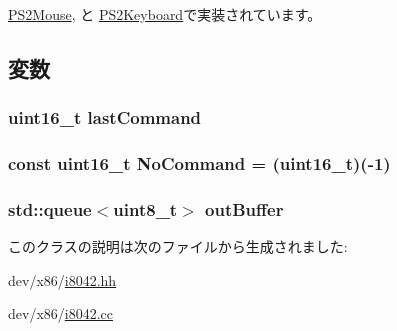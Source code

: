 \hyperlink{classX86ISA_1_1PS2Mouse_a501fdeaf8d614f432cfbf95f23675982}{PS2Mouse}, と \hyperlink{classX86ISA_1_1PS2Keyboard_a501fdeaf8d614f432cfbf95f23675982}{PS2Keyboard}で実装されています。

\subsection{変数}
\hypertarget{classX86ISA_1_1PS2Device_a0db1139e4bbd0a84a125c3aec0cb4334}{
\subsubsection[{lastCommand}]{\setlength{\rightskip}{0pt plus 5cm}uint16\_\-t {\bf lastCommand}}}
\label{classX86ISA_1_1PS2Device_a0db1139e4bbd0a84a125c3aec0cb4334}
\hypertarget{classX86ISA_1_1PS2Device_afa7b02fd8bda5e1de413e0b8776294ad}{
\subsubsection[{NoCommand}]{\setlength{\rightskip}{0pt plus 5cm}const uint16\_\-t {\bf NoCommand} = (uint16\_\-t)(-\/1)}}
\label{classX86ISA_1_1PS2Device_afa7b02fd8bda5e1de413e0b8776294ad}
\hypertarget{classX86ISA_1_1PS2Device_a89ae3ffe23f18460b725ac460c577049}{
\subsubsection[{outBuffer}]{\setlength{\rightskip}{0pt plus 5cm}std::queue$<$uint8\_\-t$>$ {\bf outBuffer}}}
\label{classX86ISA_1_1PS2Device_a89ae3ffe23f18460b725ac460c577049}


このクラスの説明は次のファイルから生成されました:\begin{DoxyCompactItemize}
\item 
dev/x86/\hyperlink{i8042_8hh}{i8042.hh}\item 
dev/x86/\hyperlink{i8042_8cc}{i8042.cc}\end{DoxyCompactItemize}
